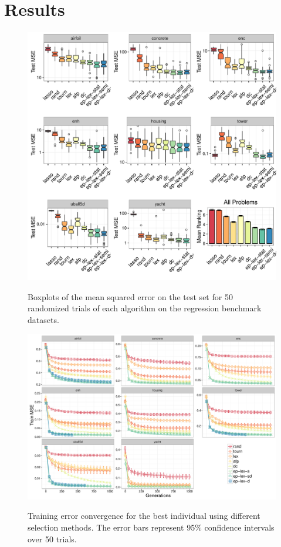 \documentclass[twoside]{article}
\begin{document}
\section{Results}\label{s:results}
\begin{figure}
\centering
  \includegraphics[width=\textwidth]{figs/regression_boxplots.pdf}\\
  \caption{Boxplots of the mean squared error on the test set for 50 randomized trials of each algorithm on the regression benchmark datasets.}\label{fig:boxplot_reg}
\end{figure}

\begin{figure}
\centering
  \includegraphics[width=\textwidth]{figs/regression_training_error.pdf}\\
 \caption{Training error convergence for the best individual using different selection methods. The error bars represent 95\% confidence intervals over 50 trials.}\label{fig:train}
\end{figure}
\end{document}
